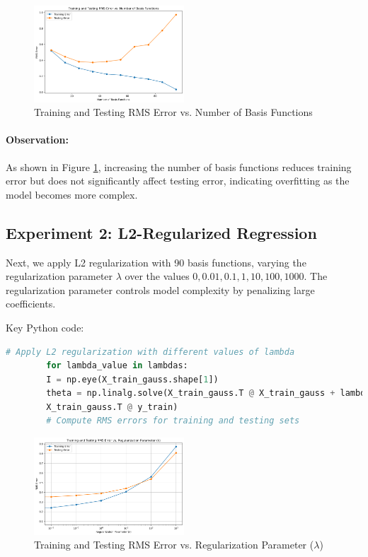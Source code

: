 \documentclass{article}
\begin{document}
	\begin{figure}[!h]
		\centering
		\includegraphics[width=0.5\textwidth]{images/q4_par4a.png}
		\caption{Training and Testing RMS Error vs. Number of Basis Functions}
		\label{fig:basis_functions_plot}
	\end{figure}
	
	\paragraph{Observation:}
	As shown in Figure \ref{fig:basis_functions_plot}, increasing the number of basis functions reduces training error but does not significantly affect testing error, indicating overfitting as the model becomes more complex.
	
	\subsection*{Experiment 2: L2-Regularized Regression}
	Next, we apply L2 regularization with 90 basis functions, varying the regularization parameter \(\lambda\) over the values \(0, 0.01, 0.1, 1, 10, 100, 1000\). The regularization parameter controls model complexity by penalizing large coefficients.
	
	Key Python code:
	\begin{lstlisting}[language=Python]
		# Apply L2 regularization with different values of lambda
		for lambda_value in lambdas:
		I = np.eye(X_train_gauss.shape[1])
		theta = np.linalg.solve(X_train_gauss.T @ X_train_gauss + lambda_value * I, 
		X_train_gauss.T @ y_train)
		# Compute RMS errors for training and testing sets
	\end{lstlisting}
	
	\begin{figure}[!h]
		\centering
		\includegraphics[width=0.5\textwidth]{images/q4_par4b.png}
		\caption{Training and Testing RMS Error vs. Regularization Parameter (\(\lambda\))}
		\label{fig:regularization_plot}
	\end{figure}
	
\end{document}
